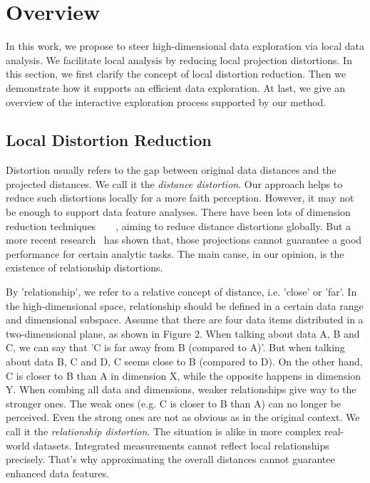 \section{Overview}
\label{section:overview}
In this work, we propose to steer high-dimensional data exploration via local data analysis. We facilitate local analysis by reducing local projection distortions. In this section, we first clarify the concept of local distortion reduction. Then we demonstrate how it supports an efficient data exploration. At last, we give an overview of the interactive exploration process supported by our method.

\subsection{Local Distortion Reduction}
Distortion usually refers to the gap between original data distances and the projected distances. We call it the \emph{distance distortion}. Our approach helps to reduce such distortions locally for a more faith perception. However, it may not be enough to support data feature analyses. There have been lots of dimension reduction techniques~\cite{jolliffe2002principal}~\cite{borg2005modern}~\cite{tenenbaum2000global}~\cite{roweis2000nonlinear}, aiming to reduce distance distortions globally. But a more recent research~\cite{DBLP:journals/tvcg/EtemadpourMPMOL15} has shown that, those projections cannot guarantee a good performance for certain analytic tasks. The main cause, in our opinion, is the existence of relationship distortions.

By 'relationship', we refer to a relative concept of distance, i.e. 'close' or 'far'. In the high-dimensional space, relationship should be defined in a certain data range and dimensional subspace. Assume that there are four data items distributed in a two-dimensional plane, as shown in Figure 2.  When talking about data A, B and C, we can say that 'C is far away from B (compared to A)'. But when talking about data B, C and D, C seems close to B (compared to D). On the other hand, C is closer to B than A in dimension X, while the opposite happens in dimension Y. When combing all data and dimensions, weaker relationships give way to the stronger ones. The weak ones (e.g. C is closer to B than A) can no longer be perceived. Even the strong ones are not as obvious as in the original context. We call it the \emph{relationship distortion}. The situation is alike in more complex real-world datasets. Integrated measurements cannot reflect local relationships precisely. That's why approximating the overall distances cannot guarantee enhanced data features.

